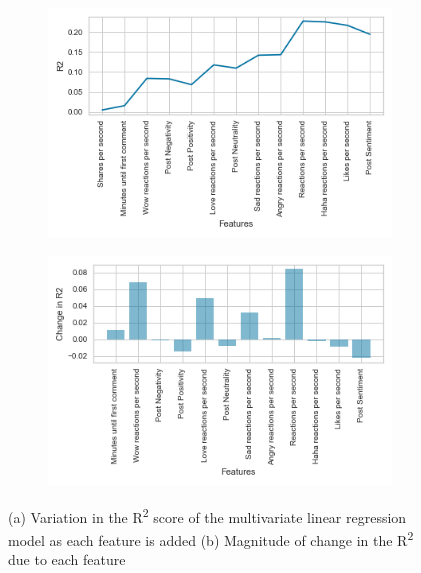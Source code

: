 \documentclass[twoside]{article}
\begin{document}
\begin{figure}[htp]
\centering
    \begin{subfigure}{0.9\textwidth}
      \includegraphics[scale=0.8]{r2_stepwise}
      \caption{}
    \end{subfigure}%
    \par
    \begin{subfigure}{0.9\textwidth}
      \includegraphics[scale=0.9]{r2_stepwise_change}
      \caption{}
    \end{subfigure}
  \caption { (a) Variation in the R\textsuperscript{2} score of the multivariate linear regression model as each feature is added (b) Magnitude of change in the R\textsuperscript{2} due to each feature }\label{fig:f}
\end{figure}
\end{document}
